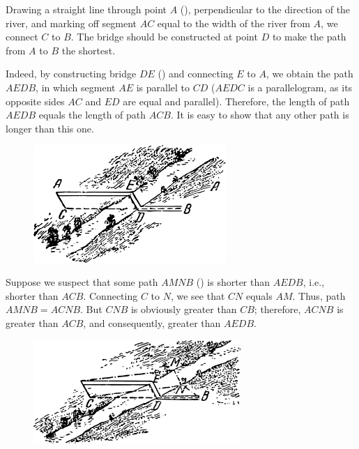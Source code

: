 \ans Drawing a straight line through point $A$ (), perpendicular to the direction of the river, and marking off segment $AC$ equal to the width of the river from $A$, we connect $C$ to $B$. The bridge should be constructed at point $D$ to make the path from $A$ to $B$ the shortest.


Indeed, by constructing bridge $DE$ () and connecting $E$ to $A$, we obtain the path $AEDB$, in which segment $AE$ is parallel to $CD$ ($AEDC$ is a parallelogram, as its opposite sides $AC$ and $ED$ are equal and parallel). Therefore, the length of path $AEDB$ equals the length of path $ACB$. It is easy to show that any other path is longer than this one. 

\begin{figure}[h!]
\centering
\includegraphics[width=0.65\textwidth]{figures/ch-02/fig-058.pdf}
\end{figure}


Suppose we suspect that some path $AMNB$ () is shorter than $AEDB$, i.e., shorter than $ACB$. Connecting $C$ to $N$, we see that $CN$ equals $AM$. Thus, path $AMNB = ACNB$. But $CNB$ is obviously greater than $CB$; therefore, $ACNB$ is greater than $ACB$, and consequently, greater than $AEDB$. 

\begin{figure}[h!]
\centering
\includegraphics[width=0.7\textwidth]{figures/ch-02/fig-059.pdf}
\end{figure}

